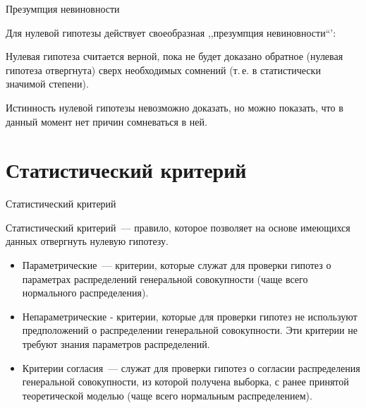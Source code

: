 \documentclass[unicode,11pt,notheorems,xcolor=table]{beamer}
\begin{document}
\begin{frame}{Презумпция невиновности}{}

    Для нулевой гипотезы действует своеобразная ,,презумпция невиновности``':

    \begin{block}{}
        Нулевая гипотеза считается верной, пока не будет доказано обратное (нулевая гипотеза отвергнута) сверх необходимых сомнений (т.\,е. в статистически значимой степени).
    \end{block}

    \vfill

    Истинность нулевой гипотезы невозможно доказать, но можно показать, что в данный момент нет причин сомневаться в ней.




%
\end{frame}


\section{Статистический критерий}

\begin{frame}{Статистический критерий}{}
    \begin{block}{}
        \alert{Статистический критерий}~--- правило, которое позволяет на основе имеющихся данных отвергнуть нулевую гипотезу. 
    \end{block}
    \bigskip
    \begin{itemize}
        \item \alert{Параметрические}~--- критерии, которые служат для проверки гипотез о параметрах распределений генеральной совокупности (чаще всего нормального распределения).
        \item \alert{Непараметрические} - критерии, которые для проверки гипотез не используют предположений о распределении генеральной совокупности. Эти критерии не требуют знания параметров распределений.
        \item \alert{Критерии согласия}~---  служат для проверки гипотез о согласии распределения генеральной совокупности, из которой получена выборка, с ранее принятой теоретической моделью (чаще всего нормальным распределением).
    \end{itemize}
    
\end{frame}
\end{document}
